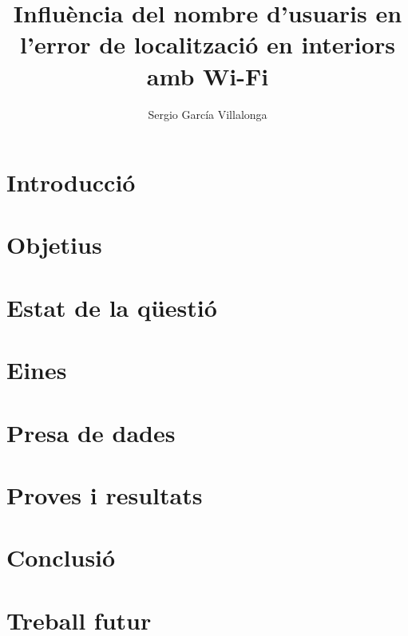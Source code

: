 \documentclass[a4paper, 10pt, twocolumn]{article}
\title{Influència del nombre d'usuaris en l’error de localització en interiors amb Wi-Fi}
\author{Sergio García Villalonga}
\begin{document}
\maketitle



\section{Introducció}

 
\section{Objetius}


\section{Estat de la qüestió}


\section{Eines}


\section{Presa de dades}


\section{Proves i resultats}


\section{Conclusió}


\section{Treball futur}




\end{document}
